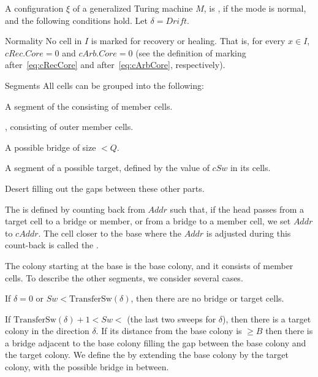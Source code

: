 \documentclass[12pt]{memoir}
\newcommand{\fld}[1]{\ensuremath{\textit{#1}}}
\def\B{B}
\newcommand{\Addr}{\fld{Addr}}
\newcommand{\cAddr}{\fld{cAddr}}
\newcommand{\cArb}{\fld{cArb}}
\newcommand{\Core}{\fld{Core}}
\newcommand{\Drift}{\fld{Drift}}
\newcommand{\cRec}{\fld{cRec}}
\newcommand{\Sweep}{\fld{Sw}}
\newcommand{\cSweep}{\fld{cSw}}
\newcommand{\TransferSw}{\mathrm{TransferSw}}
\begin{document}
\begin{definition}
\label{def:healthy}
    A configuration \( \xi \) of a generalized Turing machine \( M \),
    is , if the mode is normal, and the following conditions hold.
    Let \( \delta = \Drift \).

\begin{flushdescription}

     \item[Normality]
           No cell in \( I \) is marked for recovery or healing.
           That is, for every \( x \in I \), \( \cRec.\Core = 0 \) and
           \( \cArb.\Core = 0 \)
          (see the definition of marking after~\eqref{eq:cRecCore}
           and after~\eqref{eq:cArbCore}, respectively).

\item[Segments]
    All cells can be grouped into the following:
  \begin{bullets}
  \item A segment of the  consisting of member cells.
  \item {}, consisting of outer member cells.
  \item A possible bridge of size \( <Q \).
   \item A segment of a possible target, defined by the value of \( \cSweep \) in its cells.
    \item Desert filling out the gaps between these other parts.
  \end{bullets}
        The  is defined by counting back from \( \Addr \) such that, if the head
        passes from a target cell to a bridge or member, 
        or from a bridge to a member cell, we set \( \Addr \) to \( \cAddr \).
        The cell closer to the base where the \( \Addr \) is adjusted during
        this count-back is called the .

        The colony starting at the base is the base colony, and it consists of member cells.
        To describe the other segments, we consider several cases.
        \begin{bullets}
        \item 
        If \( \delta=0 \) or \( \Sweep < \TransferSw(\delta) \), 
        then there are no bridge or target cells.

        \item If \( \TransferSw(\delta) +1 < \Sweep <  \) (the last two sweeps for \( \delta \)),
          then there is a target colony in the direction \( \delta \).
          If its distance from the base colony is \( \ge\B \) then there is a 
          bridge adjacent to the base colony filling the gap between the 
          base colony and the target colony.
          We define the  by extending the base colony
          by the target colony, with the possible bridge in between.


\end{bullets}
\end{flushdescription}
\end{definition}
\end{document}
